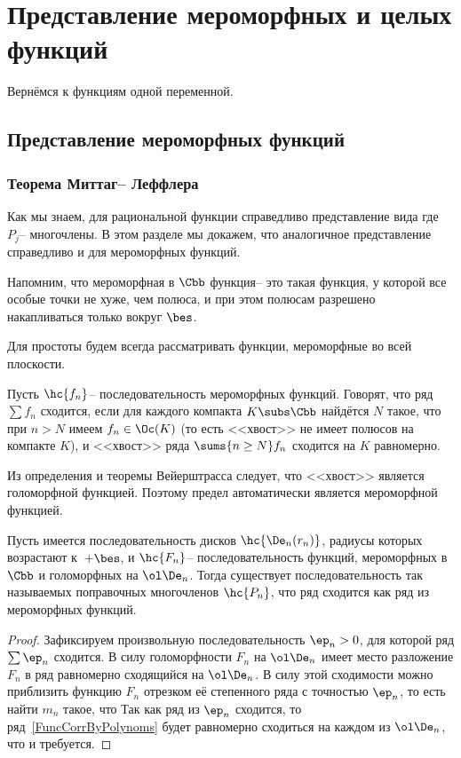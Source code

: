 \documentclass[a4paper]{article}
\begin{document}
\section{Представление мероморфных и целых функций}

Вернёмся к функциям одной переменной.

\subsection{Представление мероморфных функций}

\subsubsection{Теорема Миттаг-- Леффлера}

Как мы знаем, для рациональной функции справедливо представление вида
где $P_j$-- многочлены. В этом разделе мы докажем, что аналогичное представление
справедливо и для мероморфных функций.

Напомним, что мероморфная в $\Cbb$ функция-- это такая функция, у которой все особые точки не хуже,
чем полюса, и при этом полюсам разрешено накапливаться только вокруг $\bes$.

Для простоты будем всегда рассматривать функции, мероморфные во всей плоскости.

\begin{df}
Пусть $\hc{f_n}$-- последовательность мероморфных функций. Говорят, что ряд $\sum f_n$ сходится, если
для каждого компакта $K \subs \Cbb$ найдётся $N$ такое, что при $n > N$ имеем $f_n \in \Oc(K)$ (то есть
<<хвост>> не имеет полюсов на компакте $K$), и <<хвост>> ряда $\sums{n \ge N} f_n$ сходится на $K$ равномерно.
\end{df}

Из определения и теоремы Вейерштрасса следует, что <<хвост>> является голоморфной функцией.
Поэтому предел автоматически является мероморфной функцией.

\begin{lemma}
Пусть имеется последовательность дисков $\hc{\De_n(r_n)}$, радиусы которых возрастают к~$+\bes$,
и $\hc{F_n}$-- последовательность функций, мероморфных в $\Cbb$ и голоморфных на $\ol\De_n$.
Тогда существует последовательность так называемых поправочных многочленов $\hc{P_n}$,
что ряд
сходится как ряд из мероморфных функций.
\end{lemma}
\begin{proof}
Зафиксируем произвольную последовательность $\ep_n > 0$, для которой ряд
$\sum \ep_n$ сходится.
В силу голоморфности $F_n$ на $\ol \De_n$ имеет место разложение $F_n$ в ряд
равномерно сходящийся на $\ol \De_n$. В силу этой сходимости можно приблизить
функцию $F_n$ отрезком её степенного ряда с точностью $\ep_n$, то есть найти $m_n$ такое,
что
Так как ряд из $\ep_n$ сходится, то ряд~\eqref{FuncCorrByPolynoms} будет равномерно сходиться
на каждом из $\ol \De_n$, что и требуется.
\end{proof}
\end{document}
